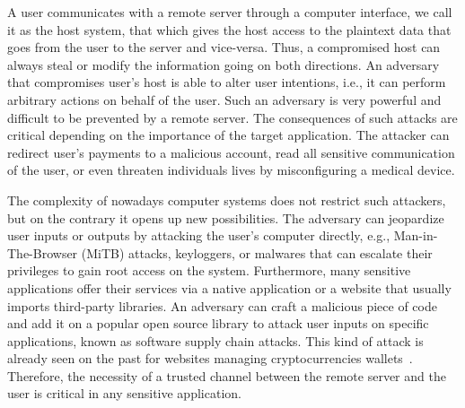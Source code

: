 A user communicates with a remote server through a computer interface, we call it as the host system, that which gives the host access to the plaintext data that goes from the user to the server and vice-versa. Thus, a compromised host can always steal or modify the information going on both directions. An adversary that compromises user's host is able to alter user intentions, i.e., it can perform arbitrary actions on behalf of the user. Such an adversary is very powerful and difficult to be prevented by a remote server. The consequences of such attacks are critical depending on the importance of the target application. The attacker can redirect user's payments to a malicious account, read all sensitive communication of the user, or even threaten individuals lives by misconfiguring a medical device. 


The complexity of nowadays computer systems does not restrict such attackers, but on the contrary it opens up new possibilities. The adversary can jeopardize user inputs or outputs by attacking the user's computer directly, e.g., Man-in-The-Browser (MiTB) attacks, keyloggers, or malwares that can escalate their privileges to gain root access on the system. Furthermore, many sensitive applications offer their services via a native application or a website that usually imports third-party libraries. An adversary can craft a malicious piece of code and add it on a popular open source library to attack user inputs on specific applications, known as software supply chain attacks. This kind of attack is already seen on the past for websites managing cryptocurrencies wallets~\cite{softSupplyChainAttack, jsSupplyChainAttack}. Therefore, the necessity of a trusted channel between the remote server and the user is critical in any sensitive application.


